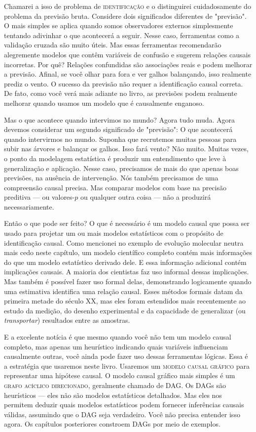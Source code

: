 Chamarei a isso de problema de \textsc{identificação} e o distinguirei cuidadosamente do problema da previsão bruta. Considere dois significados diferentes de "previsão". O mais simples se aplica quando somos observadores externos simplesmente tentando adivinhar o que acontecerá a seguir. Nesse caso, ferramentas como a validação cruzada são muito úteis. Mas essas ferramentas recomendarão alegremente modelos que contêm variáveis de confusão e sugerem relações causais incorretas. Por quê? Relações confundidas são associações reais e podem melhorar a previsão. Afinal, se você olhar para fora e ver galhos balançando, isso realmente prediz o vento. O sucesso da previsão não requer a identificação causal correta. De fato, como você verá mais adiante no livro, as previsões podem realmente melhorar quando usamos um modelo que é causalmente enganoso.

Mas o que acontece quando intervimos no mundo? Agora tudo muda. Agora devemos considerar um segundo significado de "previsão": O que acontecerá quando intervirmos no mundo. Suponha que recrutemos muitas pessoas para subir nas árvores e balançar os galhos. Isso fará vento? Não muito. Muitas vezes, o ponto da modelagem estatística é produzir um entendimento que leve à generalização e aplicação. Nesse caso, precisamos de mais do que apenas boas previsões, na ausência de intervenção. Nós também precisamos de uma compreensão causal precisa. Mas comparar modelos com base na precisão preditiva — ou valores-$p$ ou qualquer outra coisa — não a produzirá necessariamente.

Então o que pode ser feito? O que é necessário é um modelo causal que possa ser usado para projetar um ou mais modelos estatísticos com o propósito de identificação causal. Como mencionei no exemplo de evolução molecular neutra mais cedo neste capítulo, um modelo científico completo contém mais informações do que um modelo estatístico derivado dele. E essa informação adicional contém implicações causais. A maioria dos cientistas faz uso informal dessas implicações. Mas também é possível fazer uso formal delas, demonstrando logicamente quando uma estimativa identifica uma relação causal. Esses métodos formais datam da primeira metade do século XX, mas eles foram estendidos mais recentemente ao estudo da medição, do desenho experimental e da capacidade de generalizar (ou \textit{transportar}) resultados entre as amostras.

E a excelente notícia é que mesmo quando você não tem um modelo causal completo, mas apenas um heurístico indicando quais variáveis influenciam causalmente outras, você ainda pode fazer uso dessas ferramentas lógicas. Essa é a estratégia que usaremos neste livro. Usaremos um \textsc{modelo causal gráfico} para representar uma hipótese causal. O modelo causal gráfico mais simples é um \textsc{grafo acíclico direcionado}, geralmente chamado de \textsc{DAG}. Os DAGs são heurísticos — eles não são modelos estatísticos detalhados. Mas eles nos permitem deduzir quais modelos estatísticos podem fornecer inferências causais válidas, assumindo que o DAG seja verdadeiro. Você não precisa entender isso agora. Os capítulos posteriores constroem DAGs por meio de exemplos.

